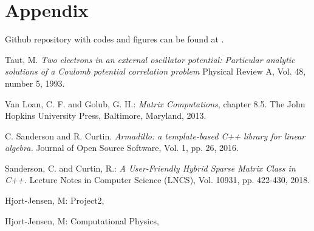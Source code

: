 \documentclass[a4paper]{article}
\title{}
\author{Daniel Pinjusic, Gudmund Gunnarsen and Ida Due-Sørensen}
\date{\today}
\begin{document}
\maketitle















\section{Appendix}

Github repository with codes and figures can be found at .


\begin{thebibliography}{9}
Taut, M. \textit{Two electrons in an external oscillator potential: Particular analytic solutions of a Coulomb potential correlation problem} Physical Review A, Vol. 48, number 5, 1993.

Van Loan, C. F. and Golub, G. H.: \textit{Matrix Computations}, chapter 8.5. The John Hopkins University Press, Baltimore, Maryland, 2013.

C. Sanderson and R. Curtin.
\textit{Armadillo: a template-based C++ library for linear algebra.}
Journal of Open Source Software, Vol. 1, pp. 26, 2016.

Sanderson, C. and  Curtin, R.:
\textit{A User-Friendly Hybrid Sparse Matrix Class in C++.}
Lecture Notes in Computer Science (LNCS), Vol. 10931, pp. 422-430, 2018. 

Hjort-Jensen, M: Project2,
\\\texttt{}

Hjort-Jensen, M: Computational Physics,
\\\texttt{}




\end{thebibliography}
\end{document}
